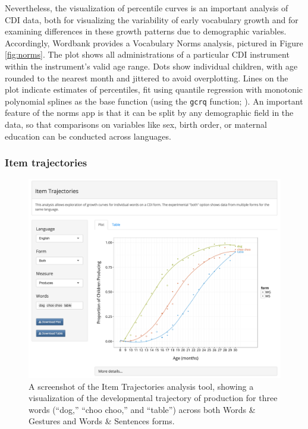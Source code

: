 \documentclass[doc,noapacite]{apa2}
\begin{document}
Nevertheless, the visualization of percentile curves is an important analysis of CDI data, both for visualizing the variability of early vocabulary growth and for examining differences in these growth patterns due to demographic variables. Accordingly, Wordbank provides a Vocabulary Norms analysis, pictured in Figure \ref{fig:norms}. The plot shows all administrations of a particular CDI instrument within the instrument's valid age range. Dots show individual children, with age rounded to the nearest month and jittered to avoid overplotting. Lines on the plot indicate estimates of percentiles, fit using quantile regression with monotonic polynomial splines as the base function (using the \texttt{gcrq} function; \cite{muggeo2013}). An important feature of the norms app is that it can be split by any demographic field in the data, so that comparisons on variables like sex, birth order, or maternal education can be conducted across languages. 

\subsubsection{Item trajectories}

\begin{figure}[t]
\includegraphics[width=6in]{figures/itemsapp.png}
\caption{\label{fig:items} A screenshot of the Item Trajectories analysis tool, showing a visualization of the developmental trajectory of production for three words (``dog,'' ``choo choo,'' and ``table'') across both Words \& Gestures and Words \& Sentences forms.}
\end{figure}
\end{document}
